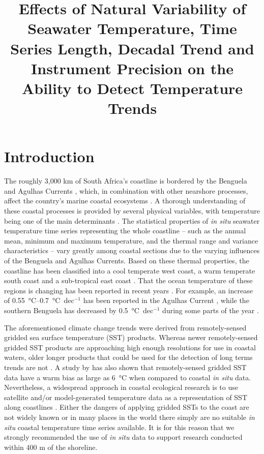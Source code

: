 \documentclass[]{ametsoc}
\title{Effects of Natural Variability of Seawater Temperature, Time Series Length, Decadal Trend and Instrument Precision on the Ability to Detect Temperature Trends}
\affiliation{Department of Biodiversity and Conservation Biology, University of the Western Cape, Bellville, Republic of South Africa}
\begin{document}
\maketitle

\section{Introduction}
The roughly 3,000 km of South Africa's coastline is bordered by the Benguela and Agulhas Currents \citep[\emph{e.g.}][]{Roberts2005,Hutchings2009}, which, in combination with other nearshore processes, affect the country's marine coastal ecosystems \citep{Santos2012a}. A thorough understanding of these coastal processes is provided by several physical variables, with temperature being one of the main determinants \citep[\emph{e.g.}][]{Blanchette2008, Tittensor2010, Couce2012}. The statistical properties of \emph{in situ} seawater temperature time series representing the whole coastline -- such as the annual mean, minimum and maximum temperature, and the thermal range and variance characteristics -- vary greatly among coastal sections due to the varying influences of the Benguela and Agulhas Currents. Based on these thermal properties, the coastline has been classified into a cool temperate west coast, a warm temperate south coast and a sub-tropical east coast \citep{Smit2013}. That the ocean temperature of these regions is changing has been reported in recent years \citep{Mead2013}. For example, an increase of \SIrange{0.55}{0.7}{\degreeCelsius}~dec$^{-1}$ has been reported in the Agulhas Current \citep{Rouault2009,Rouault2010}, while the southern Benguela has decreased by \SI{0.5}{\degreeCelsius}~dec$^{-1}$ during some parts of the year \citep{Rouault2010}.

The aforementioned climate change trends were derived from remotely-sensed gridded sea surface temperature (SST) products. Whereas newer remotely-sensed gridded SST products are approaching high enough resolutions for use in coastal waters, older longer products that could be used for the detection of long terms trends are not \citep[\emph{e.g.}][]{Chao2009, Qiu2009, Vazquez-Cuervo2013}. A study by \citet{Smit2013} has also shown that remotely-sensed gridded SST data have a warm bias as large as \SI{6}{\degreeCelsius} when compared to coastal \emph{in situ} data. Nevertheless, a widespread approach in coastal ecological research is to use satellite and/or model-generated temperature data as a representation of SST along coastlines \citep[\emph{e.g.}][]{Blanchette2008, Broitman2008a, Tyberghein2012}. Either the dangers of applying gridded SSTs to the coast are not widely known or in many places in the world there simply are no suitable \emph{in situ} coastal temperature time series available. It is for this reason that we strongly recommended the use of \emph{in situ} data to support research conducted within 400 m of the shoreline.
\end{document}
